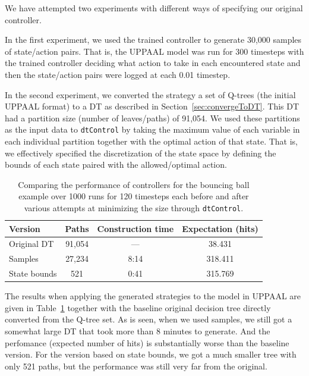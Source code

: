 \documentclass{article}
\begin{document}
We have attempted two experiments with different ways of specifying our original
controller.

In the first experiment, we used the trained controller to generate 30,000
samples of state/action pairs. That is, the UPPAAL model was run for 300
timesteps with the trained controller deciding what action to take in each
encountered state and then the state/action pairs were logged at each 0.01
timestep.

In the second experiment, we converted the strategy a set of Q-trees (the
initial UPPAAL format) to a DT as described in Section~\ref{sec:convergeToDT}.
This DT had a partition size (number of leaves/paths) of 91,054. We used these
partitions as the input data to \texttt{dtControl} by taking the maximum value
of each variable in each individual partition together with the optimal action
of that state. That is, we effectively specified the discretization of the state
space by defining the bounds of each state paired with the allowed/optimal
action.

\begin{table}[ht]
    \centering
    \caption{%
        Comparing the performance of controllers for the bouncing ball example
        over 1000 runs for 120 timesteps each before and after various attempts
        at minimizing the size through \texttt{dtControl}.  
    }\label{tab:dtcontrolTable}
    \begin{tabular}[t]{lccc}
        \toprule
        Version & Paths & Construction time & Expectation (hits) \\
        \midrule
        Original DT & 91,054 & --- & 38.431 \\
        Samples & 27,234 & 8:14 & 318.411 \\
        State bounds & 521 & 0:41 & 315.769 \\
        \bottomrule
    \end{tabular}
\end{table}


The results when applying the generated strategies to the model in UPPAAL are
given in Table~\ref{tab:dtcontrolTable} together with the baseline original
decision tree directly converted from the Q-tree set. As is seen, when we used
samples, we still got a somewhat large DT that took more than 8 minutes to
generate. And the perfomance (expected number of hits) is substantially worse
than the baseline version. For the version based on state bounds, we got a much
smaller tree with only 521 paths, but the performance was still very far from
the original.
\end{document}
